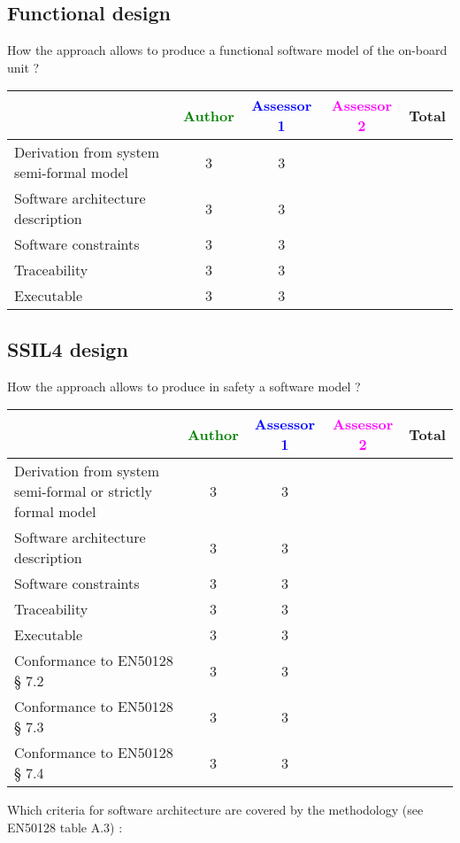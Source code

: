 \subsection{Functional design}

How the approach allows to  produce a functional software model of the on-board unit ?

\begin{tabular}{|l | c | c | c | c|}
\hline
& \textcolor{green}{Author} & \textcolor{blue}{Assessor 1} & \textcolor{magenta}{Assessor 2} & Total \\
\hline
Derivation from system semi-formal model  & 3 & 3 & &  \\
\hline 
Software architecture description  & 3 & 3 & &  \\
\hline
Software constraints  & 3 & 3 & &  \\
\hline
Traceability  & 3 & 3 & &  \\
\hline
Executable  & 3  & 3 & &  \\
\hline
\end{tabular}

\subsection{SSIL4 design}

How the approach allows to  produce in safety a software model ?

\begin{tabular}{|l | c | c | c | c|}
\hline
& \textcolor{green}{Author} & \textcolor{blue}{Assessor 1} & \textcolor{magenta}{Assessor 2} & Total \\
\hline
Derivation from system semi-formal or strictly formal model  & 3 & 3 & &  \\
\hline 
Software architecture description  & 3 & 3 & &  \\
\hline
Software constraints  & 3 & 3 & &  \\
\hline
Traceability  & 3 & 3 & &  \\
\hline
Executable  & 3 & 3 & &  \\
\hline
Conformance to EN50128 § 7.2  & 3 & 3 & &  \\
\hline
Conformance to EN50128 § 7.3  & 3 & 3 & &  \\
\hline
Conformance to EN50128 § 7.4  & 3 & 3 & &  \\
\hline
\end{tabular}

Which criteria for software architecture are covered by the methodology
(see EN50128 table A.3) :

